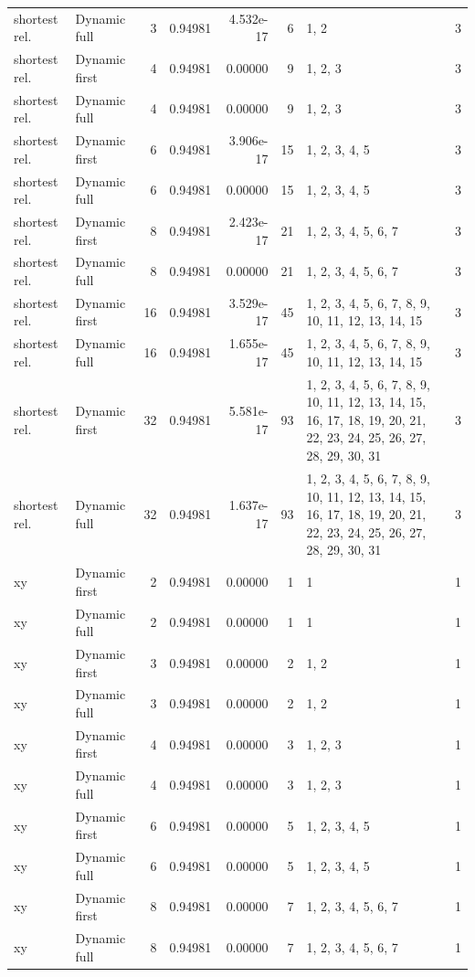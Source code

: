 \documentclass[10pt,a4paper]{article}
\begin{document}
\begin{longtable}{@{}p{23mm}p{29mm}rrrrp{36mm}r@{}}
shortest rel. & Dynamic full & 3 & 0.94981 & 4.532e-17 & 6 & 1, 2 & 3 \\
shortest rel. & Dynamic first & 4 & 0.94981 & 0.00000 & 9 & 1, 2, 3 & 3 \\
shortest rel. & Dynamic full & 4 & 0.94981 & 0.00000 & 9 & 1, 2, 3 & 3 \\
shortest rel. & Dynamic first & 6 & 0.94981 & 3.906e-17 & 15 & 1, 2, 3, 4, 5 & 3 \\
shortest rel. & Dynamic full & 6 & 0.94981 & 0.00000 & 15 & 1, 2, 3, 4, 5 & 3 \\
shortest rel. & Dynamic first & 8 & 0.94981 & 2.423e-17 & 21 & 1, 2, 3, 4, 5, 6, 7 & 3 \\
shortest rel. & Dynamic full & 8 & 0.94981 & 0.00000 & 21 & 1, 2, 3, 4, 5, 6, 7 & 3 \\
shortest rel. & Dynamic first & 16 & 0.94981 & 3.529e-17 & 45 & 1, 2, 3, 4, 5, 6, 7, 8, 9, 10, 11, 12, 13, 14, 15 & 3 \\
shortest rel. & Dynamic full & 16 & 0.94981 & 1.655e-17 & 45 & 1, 2, 3, 4, 5, 6, 7, 8, 9, 10, 11, 12, 13, 14, 15 & 3 \\
shortest rel. & Dynamic first & 32 & 0.94981 & 5.581e-17 & 93 & 1, 2, 3, 4, 5, 6, 7, 8, 9, 10, 11, 12, 13, 14, 15, 16, 17, 18, 19, 20, 21, 22, 23, 24, 25, 26, 27, 28, 29, 30, 31 & 3 \\
shortest rel. & Dynamic full & 32 & 0.94981 & 1.637e-17 & 93 & 1, 2, 3, 4, 5, 6, 7, 8, 9, 10, 11, 12, 13, 14, 15, 16, 17, 18, 19, 20, 21, 22, 23, 24, 25, 26, 27, 28, 29, 30, 31 & 3 \\
xy & Dynamic first & 2 & 0.94981 & 0.00000 & 1 & 1 & 1 \\
xy & Dynamic full & 2 & 0.94981 & 0.00000 & 1 & 1 & 1 \\
xy & Dynamic first & 3 & 0.94981 & 0.00000 & 2 & 1, 2 & 1 \\
xy & Dynamic full & 3 & 0.94981 & 0.00000 & 2 & 1, 2 & 1 \\
xy & Dynamic first & 4 & 0.94981 & 0.00000 & 3 & 1, 2, 3 & 1 \\
xy & Dynamic full & 4 & 0.94981 & 0.00000 & 3 & 1, 2, 3 & 1 \\
xy & Dynamic first & 6 & 0.94981 & 0.00000 & 5 & 1, 2, 3, 4, 5 & 1 \\
xy & Dynamic full & 6 & 0.94981 & 0.00000 & 5 & 1, 2, 3, 4, 5 & 1 \\
xy & Dynamic first & 8 & 0.94981 & 0.00000 & 7 & 1, 2, 3, 4, 5, 6, 7 & 1 \\
xy & Dynamic full & 8 & 0.94981 & 0.00000 & 7 & 1, 2, 3, 4, 5, 6, 7 & 1 \\

\end{longtable}
\end{document}
